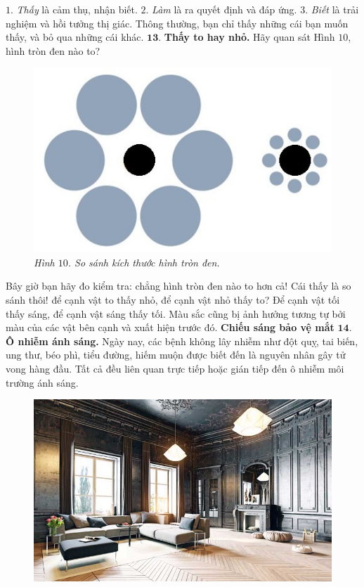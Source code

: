 \begin{multicols}{2}
	\vskip 0.1cm
	$1$. \textit{Thấy} là cảm thụ, nhận biết.
	\vskip 0.1cm
	$2$. \textit{Làm} là ra quyết định và đáp ứng. 
	\vskip 0.1cm
	$3$. \textit{Biết} là trải nghiệm và hồi tưởng thị giác.
	\vskip 0.1cm
	Thông thường, bạn chỉ thấy những cái bạn muốn thấy, và bỏ qua những cái khác.  
	\vskip 0.1cm
	$\pmb{13.}$ \textbf{\color{timhieukhoahoc}Thấy to hay nhỏ.}
	\vskip 0.1cm Hãy quan sát Hình $10$, hình tròn đen nào to? 
	\begin{figure}[H]
		\vspace*{-5pt}
		\centering
		\captionsetup{labelformat= empty, justification=centering}
		\includegraphics[width= 1\linewidth]{10}
		\caption{\small\textit{\color{timhieukhoahoc}Hình $10$. So sánh kích thước hình tròn đen.}}
		\vspace*{-10pt}
	\end{figure}
	Bây giờ bạn hãy đo kiểm tra: chẳng hình tròn đen nào to hơn cả! 
	\vskip 0.1cm
	Cái thấy là so sánh thôi! để cạnh vật to thấy nhỏ, để cạnh vật nhỏ thấy to? Để cạnh vật tối thấy sáng, để cạnh vật sáng thấy tối. Màu sắc cũng bị ảnh hưởng tương tự bởi màu của các vật bên cạnh và xuất hiện trước đó.  
	\vskip 0.1cm
	\textbf{\color{timhieukhoahoc}Chiếu sáng bảo vệ mắt}
	\vskip 0.1cm
	$\pmb{14.}$ \textbf{\color{timhieukhoahoc}Ô nhiễm ánh sáng.}
	\vskip 0.1cm
	Ngày nay, các bệnh không lây nhiễm như đột quỵ, tai biến, ung thư, béo phì, tiểu đường, hiếm muộn được biết đến là nguyên nhân gây tử vong hàng đầu. Tất cả đều liên quan trực tiếp hoặc gián tiếp đến ô nhiễm môi trường ánh sáng. 
	\begin{figure}[H]
		\vspace*{-5pt}
		\centering
		\captionsetup{labelformat= empty, justification=centering}
		\includegraphics[width= 1\linewidth]{11}

\end{figure}
\end{multicols}
